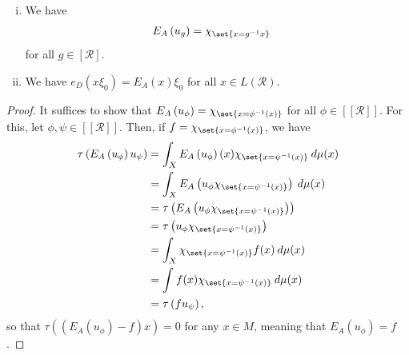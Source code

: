 \documentclass[10pt]{mypackage}
\begin{document}
\begin{proposition}\hfill
  \begin{enumerate}[(i)]
    \item We have
    \begin{align*}
      E_A\left( u_{g} \right) &= \chi_{\set{x = g^{-1}x}}
    \end{align*}
    for all $g\in \left[ \mathcal{R} \right]$.
    \item We have $e_D\left( x\xi_0 \right) = E_A(x)\xi_0$ for all $x\in L\left( \mathcal{R} \right)$.
  \end{enumerate}
\end{proposition}
\begin{proof}
  It suffices to show that $E_A\left( u_{\phi} \right) = \chi_{\set{x = \phi^{-1}(x)}}$ for all $\phi\in \left[ \left[ \mathcal{R} \right] \right]$. For this, let $\phi,\psi\in \left[ \left[ \mathcal{R} \right] \right]$. Then, if $f = \chi_{\set{x = \phi^{-1}(x)}}$, we have
  \begin{align*}
    \tau\left( E_A\left( u_{\phi} \right)u_{\psi} \right) &= \int_{X}^{} E_A\left( u_{\phi} \right)(x)\chi_{\set{x = \psi^{-1}(x)}}\:d\mu(x)\\
                                                          &= \int_{X}^{} E_A\left( u_{\phi}\chi_{\set{x = \psi^{-1}(x)}} \right)\:d\mu(x)\\
                                                          &= \tau\left( E_A\left( u_{\phi}\chi_{\set{x = \psi^{-1}(x)}} \right) \right)\\
                                                          &= \tau\left( u_{\phi}\chi_{\set{x = \psi^{-1}(x)}} \right)\\
                                                          &= \int_{X}^{} \chi_{\set{x = \psi^{-1}(x)}}f(x)\:d\mu(x)\\
                                                          &= \int_{}^{} f(x)\chi_{\set{x = \psi^{-1}(x)}}\:d\mu(x)\\
                                                          &= \tau\left( fu_{\psi} \right),
  \end{align*}
  so that $\tau\left( \left( E_A\left( u_{\phi} \right)-f \right)x \right) = 0$ for any $x\in M$, meaning that $E_{A}\left( u_{\phi} \right) = f$.
\end{proof}
\nocite{pedersen_cstar_algebras_automorphism_groups,davidson_functional_analysis,ii1_factors_houdayer,ii1_factors_anantharaman_popa}
\printbibliography
\end{document}
